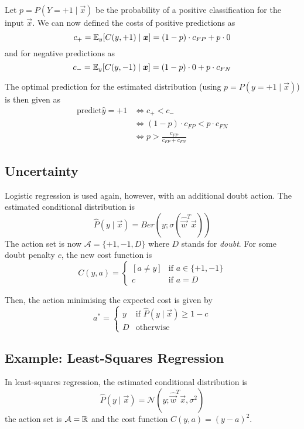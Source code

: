 Let $p = P(Y = +1 \mid \vec{x})$ be the
probability of a positive classification
for the input $\vec{x}$.
We can now defined the costs of positive
predictions as
\begin{equation*}
c_+ = \mathbb{E}_y[C(y, +1) \mid \boldsymbol{x}]
= (1 - p) \cdot c_{FP} + p \cdot 0
\end{equation*}
and for negative predictions as
\begin{equation*}
c_- = \mathbb{E}_y[C(y, -1) \mid \boldsymbol{x}]
= (1 - p) \cdot 0 + p \cdot c_{FN}
\end{equation*}

The optimal prediction for the estimated
distribution 
(using $p = P(y = +1 \mid \vec{x})$)
is then given as
\begin{align*}
\text{predict} \hat{y} = +1
&\Leftrightarrow c_+ < c_- \\
&\Leftrightarrow (1-p) \cdot c_{FP} < p \cdot c_{FN} \\
&\Leftrightarrow p > \frac{c_{FP}}{c_{FP} + c_{FN}}
\end{align*}


\subsection{Uncertainty}
Logistic regression is used again,
however, with an additional doubt action.
The estimated conditional distribution is
\begin{equation*}
\hat{P}(y \mid \vec{x}) =
Ber(y ; \sigma(\hat{\vec{w}}^T \vec{x}))
\end{equation*}
The action set is now
$\mathcal{A} = \{+1, -1, D\}$
where $D$ stands for \emph{doubt}.
For some doubt penalty $c$, the
new cost function is
\begin{equation*}
C(y, a) =
\begin{cases}
[a \neq y] & \text{if $a \in \{+1, -1\}$} \\
c & \text{if $a = D$}
\end{cases}
\end{equation*}

Then, the action minimising the expected
cost is given by
\begin{equation*}
a^* = \begin{cases}
y & \text{if $\hat{P}(y \mid \vec{x}) \geq 1 - c$} \\
D & \text{otherwise}
\end{cases}
\end{equation*}


\subsection{Example: Least-Squares Regression}
In least-squares regression,
the estimated conditional distribution is
\begin{equation*}
\hat{P}(y \mid \vec{x}) =
\mathcal{N}(y ; \hat{\vec{w}}^T \vec{x}, \sigma^2)
\end{equation*}
the action set is
$\mathcal{A} = \mathbb{R}$ and
the cost function
$C(y, a) = (y - a)^2$.

